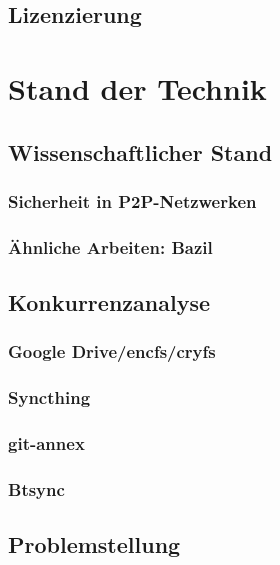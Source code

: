 \documentclass[11pt,ngerman,toc=listof,index=totoc]{scrreprt}
\begin{document}
\section{Lizenzierung}\label{lizenzierung}

\chapter{Stand der Technik}\label{stand-der-technik}

\section{Wissenschaftlicher Stand}\label{wissenschaftlicher-stand}

\subsection{Sicherheit in
P2P-Netzwerken}\label{sicherheit-in-p2p-netzwerken}

\subsection{Ähnliche Arbeiten: Bazil}\label{uxe4hnliche-arbeiten-bazil}

\section{Konkurrenzanalyse}\label{konkurrenzanalyse}

\subsection{Google Drive/encfs/cryfs}\label{google-driveencfscryfs}

\subsection{Syncthing}\label{syncthing}

\subsection{git-annex}\label{git-annex}

\subsection{Btsync}\label{btsync}

\section{Problemstellung}\label{problemstellung}
\end{document}
